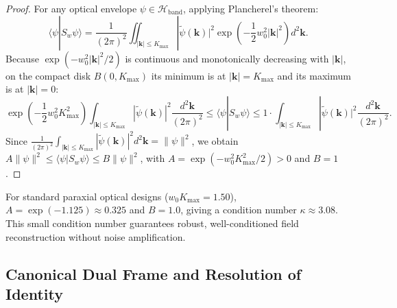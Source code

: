 \documentclass[11pt,a4paper]{article}
\begin{document}
\begin{proof}
For any optical envelope $\psi \in \mathcal{H}_{\text{band}}$, applying Plancherel's theorem:
\begin{equation}
\langle \psi | S_w \psi \rangle = \frac{1}{(2\pi)^2} \iint_{|\mathbf{k}| \le K_{\max}} |\widetilde{\psi}(\mathbf{k})|^2 \exp\left( - \frac{1}{2} w_0^2 |\mathbf{k}|^2 \right) d^2\mathbf{k}.
\label{eq:plancherel_frame}
\end{equation}
Because $\exp(-w_0^2 |\mathbf{k}|^2 / 2)$ is continuous and monotonically decreasing with $|\mathbf{k}|$, on the compact disk $B(0, K_{\max})$ its minimum is at $|\mathbf{k}| = K_{\max}$ and its maximum is at $|\mathbf{k}| = 0$:
\begin{equation}
\exp\left( - \frac{1}{2} w_0^2 K_{\max}^2 \right) \int_{|\mathbf{k}| \le K_{\max}} |\widetilde{\psi}(\mathbf{k})|^2 \frac{d^2\mathbf{k}}{(2\pi)^2} \le \langle \psi | S_w \psi \rangle \le 1 \cdot \int_{|\mathbf{k}| \le K_{\max}} |\widetilde{\psi}(\mathbf{k})|^2 \frac{d^2\mathbf{k}}{(2\pi)^2}.
\label{eq:frame_bounds_sandwiched}
\end{equation}
Since $\frac{1}{(2\pi)^2} \int_{|\mathbf{k}| \le K_{\max}} |\widetilde{\psi}(\mathbf{k})|^2 d^2\mathbf{k} = \|\psi\|^2$, we obtain $A \|\psi\|^2 \le \langle \psi | S_w \psi \rangle \le B \|\psi\|^2$, with $A = \exp(-w_0^2 K_{\max}^2 / 2) > 0$ and $B = 1$.
\end{proof}

For standard paraxial optical designs ($w_0 K_{\max} = 1.50$), $A = \exp(-1.125) \approx 0.325$ and $B = 1.0$, giving a condition number $\kappa \approx 3.08$. This small condition number guarantees robust, well-conditioned field reconstruction without noise amplification.

\subsection{Canonical Dual Frame and Resolution of Identity}
\end{document}
